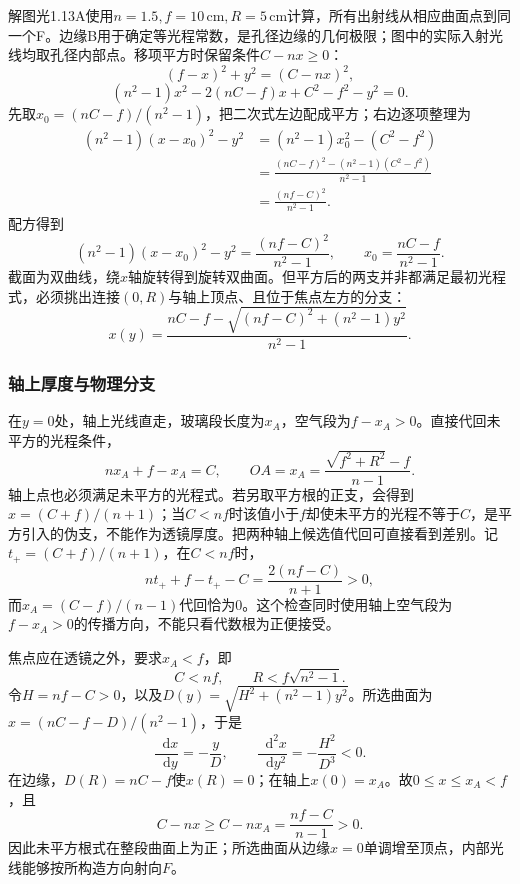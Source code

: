 \documentclass[UTF8,fontset=fandol,a4paper,11pt]{ctexart}
\newcommand{\dd}{\mathop{}\!\mathrm{d}}
\newcommand{\figcaption}[1]{\par\vspace{2pt}{\small\color{muted}#1}\par}
\begin{document}
\begin{center}
\begin{minipage}{.98\linewidth}
\figcaption{解图光1.13A\quad 从同一波面到焦点比较未平方的光程}
\end{minipage}\end{center}
解图光1.13A使用$n=1.5,f=10\,\mathrm{cm},R=5\,\mathrm{cm}$计算，所有出射线从相应曲面点到同一个F。边缘B用于确定等光程常数，是孔径边缘的几何极限；图中的实际入射光线均取孔径内部点。移项平方时保留条件$C-nx\ge0$：
\[
(f-x)^2+y^2=(C-nx)^2,
\]
\[
(n^2-1)x^2-2(nC-f)x+C^2-f^2-y^2=0.
\]
先取$x_0=(nC-f)/(n^2-1)$，把二次式左边配成平方；右边逐项整理为
\[
\begin{aligned}
(n^2-1)(x-x_0)^2-y^2
&=(n^2-1)x_0^2-(C^2-f^2)\\
&=\frac{(nC-f)^2-(n^2-1)(C^2-f^2)}{n^2-1}\\
&=\frac{(nf-C)^2}{n^2-1}.
\end{aligned}
\]
配方得到
\[
\boxed{(n^2-1)(x-x_0)^2-y^2
=\frac{(nf-C)^2}{n^2-1}},\qquad
x_0=\frac{nC-f}{n^2-1}.
\]
截面为双曲线，绕$x$轴旋转得到旋转双曲面。但平方后的两支并非都满足最初光程式，必须挑出连接$(0,R)$与轴上顶点、且位于焦点左方的分支：
\[
\boxed{x(y)=\frac{nC-f-
\sqrt{(nf-C)^2+(n^2-1)y^2}}{n^2-1}}.
\]
\subsubsection*{轴上厚度与物理分支}
在$y=0$处，轴上光线直走，玻璃段长度为$x_A$，空气段为$f-x_A>0$。直接代回未平方的光程条件，
\[
nx_A+f-x_A=C,
\qquad
\boxed{OA=x_A=\frac{\sqrt{f^2+R^2}-f}{n-1}}.
\]
轴上点也必须满足未平方的光程式。若另取平方根的正支，会得到$x=(C+f)/(n+1)$；当$C<nf$时该值小于$f$却使未平方的光程不等于$C$，是平方引入的伪支，不能作为透镜厚度。把两种轴上候选值代回可直接看到差别。记$t_+=(C+f)/(n+1)$，在$C<nf$时，
\[
nt_++f-t_+-C
=\frac{2(nf-C)}{n+1}>0,
\]
而$x_A=(C-f)/(n-1)$代回恰为0。这个检查同时使用轴上空气段为$f-x_A>0$的传播方向，不能只看代数根为正便接受。

焦点应在透镜之外，要求$x_A<f$，即
\[
C<nf,\qquad
\boxed{R<f\sqrt{n^2-1}}.
\]
令$H=nf-C>0$，以及$D(y)=\sqrt{H^2+(n^2-1)y^2}$。所选曲面为$x=(nC-f-D)/(n^2-1)$，于是
\[
\frac{\dd x}{\dd y}=-\frac{y}{D},\qquad
\frac{\dd^2x}{\dd y^2}=-\frac{H^2}{D^3}<0.
\]
在边缘，$D(R)=nC-f$使$x(R)=0$；在轴上$x(0)=x_A$。故$0\le x\le x_A<f$，且
\[
C-nx\ge C-nx_A=\frac{nf-C}{n-1}>0.
\]
因此未平方根式在整段曲面上为正；所选曲面从边缘$x=0$单调增至顶点，内部光线能够按所构造方向射向$F$。
\end{document}
